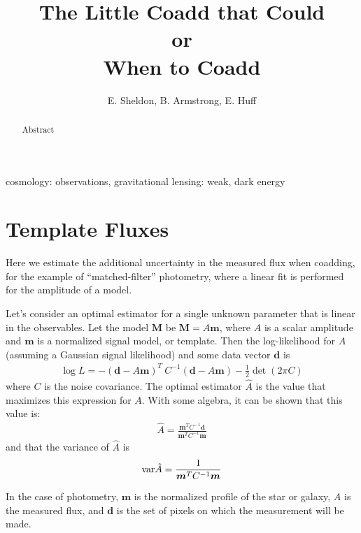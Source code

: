 \documentclass[a4paper,fleqn,usenatbib,referee]{mnras}
\title{The Little Coadd that Could\\
or\\
When to Coadd}
\author[E. Sheldon, B. Armstrong, E. Huff]{E. Sheldon, B. Armstrong, E. Huff}
\begin{document}
\maketitle

\begin{abstract}

    Abstract

\end{abstract}


\begin{keywords}                                                                    
    cosmology: observations,
    gravitational lensing: weak,
    dark energy
\end{keywords} 

\section{Template Fluxes} \label{sec:template}

Here we estimate the additional uncertainty in the measured flux when coadding,
for the example of ``matched-filter'' photometry, where a linear fit is performed
for the amplitude of a model.

Let's consider an optimal estimator for a single unknown parameter that
is linear in the observables. Let the model $\boldsymbol{M}$ be $\boldsymbol{M}
= A\boldsymbol{m}$, where $A$ is a scalar amplitude and $\boldsymbol{m}$ is a
normalized signal model, or template. Then the log-likelihood for $A$ (assuming
a Gaussian signal likelihood) and some data vector $\boldsymbol{d}$ is
\begin{align}
  \log L = - (\boldsymbol{d} - A\boldsymbol{m})^T\: C^{-1} (\boldsymbol{d} - A\boldsymbol{m}) - \frac{1}{2} \det(2\pi C )
\end{align}
where $C$ is the noise covariance. The optimal estimator $\hat{A}$ is the value
that maximizes this expression for $A$. With some algebra, it can be shown that
this value is:
\begin{align}
\hat{A} = \frac{\boldsymbol{m}^T C^{-1} \boldsymbol{d}}{\boldsymbol{m}^T C^{-1} \boldsymbol{m}}
\end{align}
and that the variance of $\hat{A}$ is
\begin{align}
{\rm var}\hat{A} = \frac{1}{{\boldsymbol{m}^T C^{-1} \boldsymbol{m}}}
\end{align}

In the case of photometry, $\boldsymbol{m}$ is the normalized profile of the
star or galaxy, $A$ is the measured flux, and $\boldsymbol{d}$ is the set of
pixels on which the measurement will be made.
\end{document}
